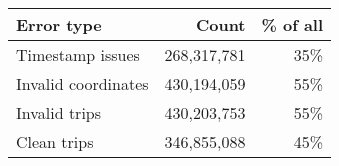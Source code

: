 \begin{tabular}{lrr}
\toprule
Error type & Count & \% of all \\
\midrule
Timestamp issues & 268,317,781 & 35\% \\
Invalid coordinates & 430,194,059 & 55\% \\
\midrule
Invalid trips & 430,203,753 & 55\% \\
Clean trips & 346,855,088 & 45\% \\
\bottomrule
\end{tabular}